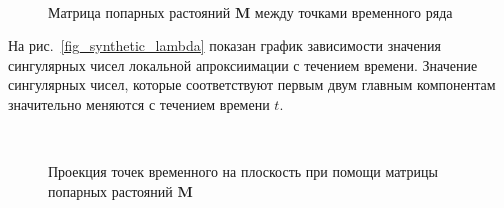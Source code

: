 \documentclass[12pt, twoside]{article}
\begin{document}
\begin{figure}[h!t]\center
{}
\\
\caption{Матрица попарных растояний $\textbf{M}$ между точками временного ряда}
\label{fig_synthetic_distance}
\end{figure}

На рис.~\ref{fig_synthetic_lambda} показан график зависимости значения сингулярных чисел локальной апроксиимации с течением времени. Значение сингулярных чисел, которые соответствуют первым двум главным компонентам значительно меняются с течением времени $t$. 

\begin{figure}[h!t]\center
{}
\\
\caption{Проекция точек временного на плоскость при помощи матрицы попарных растояний $\textbf{M}$}
\label{fig_synthetic_2D}
\end{figure}
\end{document}
